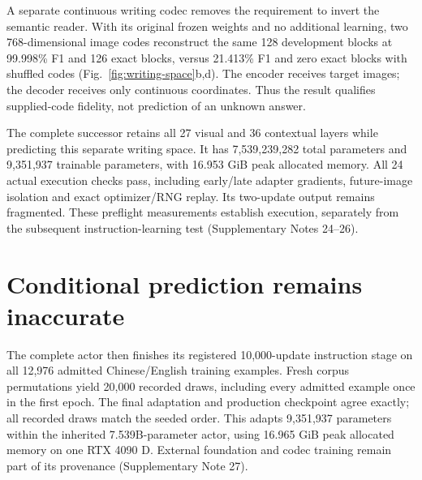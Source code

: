 \documentclass[12pt,a4paper]{article}
\begin{document}
A separate continuous writing codec removes the requirement to invert the
semantic reader. With its original frozen weights and no additional learning,
two 768-dimensional image codes reconstruct the same 128 development blocks
at 99.998\% F1 and 126 exact blocks, versus 21.413\% F1 and zero exact blocks
with shuffled codes (Fig.~\ref{fig:writing-space}b,d). The encoder receives
target images; the decoder receives only continuous coordinates. Thus the
result qualifies supplied-code fidelity, not prediction of an unknown answer.

The complete successor retains all 27 visual and 36 contextual layers while
predicting this separate writing space. It has 7,539,239,282 total parameters
and 9,351,937 trainable parameters, with 16.953 GiB peak allocated memory.
All 24 actual execution checks pass, including early/late adapter gradients,
future-image isolation and exact optimizer/RNG replay. Its two-update
output remains fragmented. These preflight measurements establish execution,
separately from the subsequent instruction-learning test
(Supplementary Notes 24--26).


\section*{Conditional prediction remains inaccurate}
The complete actor then finishes its registered 10,000-update instruction
stage on all 12,976 admitted Chinese/English training examples. Fresh corpus
permutations yield 20,000 recorded draws, including every admitted example
once in the first epoch. The final adaptation and production checkpoint
agree exactly; all recorded draws match the seeded order. This adapts
9,351,937 parameters within the inherited 7.539B-parameter actor, using
16.965 GiB peak allocated memory on one RTX 4090 D. External foundation and
codec training remain part of its provenance (Supplementary Note 27).
\end{document}
